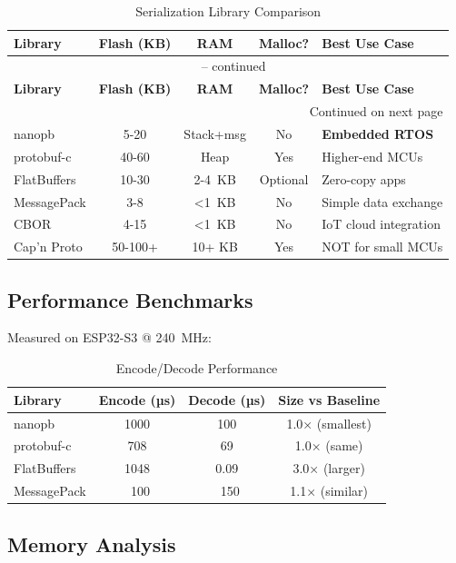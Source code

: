 \begin{longtable}{lcccp{4cm}}
\caption{Serialization Library Comparison} \\
\toprule
\textbf{Library} & \textbf{Flash (KB)} & \textbf{RAM} & \textbf{Malloc?} & \textbf{Best Use Case} \\
\midrule
\endfirsthead
\multicolumn{5}{c}{{\tablename\ \thetable{} -- continued}} \\
\toprule
\textbf{Library} & \textbf{Flash (KB)} & \textbf{RAM} & \textbf{Malloc?} & \textbf{Best Use Case} \\
\midrule
\endhead
\midrule
\multicolumn{5}{r}{{Continued on next page}} \\
\endfoot
\bottomrule
\endlastfoot
nanopb & 5-20 & Stack+msg & No & \textbf{Embedded RTOS} \\
protobuf-c & 40-60 & Heap & Yes & Higher-end MCUs \\
FlatBuffers & 10-30 & 2-4~KB & Optional & Zero-copy apps \\
MessagePack & 3-8 & <1~KB & No & Simple data exchange \\
CBOR & 4-15 & <1~KB & No & IoT cloud integration \\
Cap'n Proto & 50-100+ & 10+ KB & Yes & NOT for small MCUs \\
\end{longtable}

\subsection{Performance Benchmarks}

Measured on ESP32-S3 @ 240~MHz:

\begin{table}[H]
\centering
\caption{Encode/Decode Performance}
\begin{tabular}{lccc}
\toprule
\textbf{Library} & \textbf{Encode (µs)} & \textbf{Decode (µs)} & \textbf{Size vs Baseline} \\
\midrule
nanopb & 1000 & 100 & 1.0× (smallest) \\
protobuf-c & 708 & 69 & 1.0× (same) \\
FlatBuffers & 1048 & 0.09 & 3.0× (larger) \\
MessagePack & ~100 & ~150 & 1.1× (similar) \\
\bottomrule
\end{tabular}
\end{table}

\subsection{Memory Analysis}


